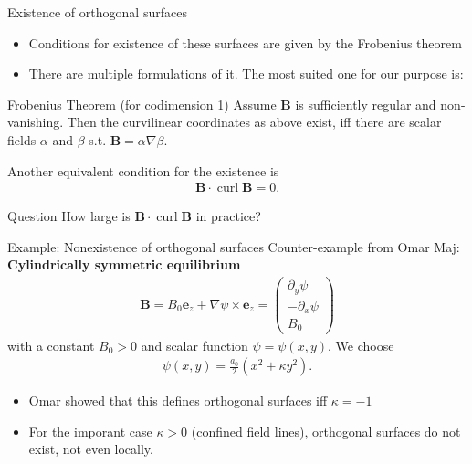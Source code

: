 \documentclass[
	english,%
	logo=false,%
	eurofusion=false, %
	titlegraphic=true, %
	]{ippbeamer}
\DeclareMathOperator{\curl}{curl}
\begin{document}
\begin{frame}{Existence of orthogonal surfaces}
	\begin{itemize}
		\item Conditions for existence of these surfaces are given by the 
			Frobenius theorem
		\item There are multiple formulations of it. The most suited one for our purpose is:
	\end{itemize}
	\begin{exampleblock}{Frobenius Theorem (for codimension 1)}
		Assume $\mathbf{B}$ is sufficiently regular and non-vanishing. Then the curvilinear coordinates as above 
		exist, iff there are scalar fields $\alpha$ and $\beta$ s.t. $\mathbf{B} = \alpha \nabla \beta$. 
	\end{exampleblock}

	Another equivalent condition for the existence is
	\begin{align*}
		\mathbf{B}\cdot \curl \mathbf{B} = 0.
	\end{align*}
	\vspace*{-0.75cm}
	\begin{exampleblock}{Question}
		How large is $\mathbf{B}\cdot \curl \mathbf{B}$ in practice?
	\end{exampleblock}

\end{frame}

\begin{frame}{Example: Nonexistence of orthogonal surfaces}
	Counter-example from Omar Maj: \textbf{Cylindrically symmetric equilibrium}
	\begin{align*}
		\mathbf{B} = B_0 \mathbf{e}_z + \nabla \psi \times \mathbf{e}_z
		= \begin{pmatrix}\partial_y \psi \\ -\partial_x  \psi \\ B_0 \end{pmatrix}
	\end{align*}
	with a constant $B_0 > 0$ and scalar function $\psi = \psi(x,y)$. 
	We choose 
	\begin{align*}
		\psi(x,y) = \frac{a_0}{2} (x^2 + \kappa y^2).
	\end{align*}
	\begin{itemize}
		\item Omar showed that this defines orthogonal surfaces iff 
			$\kappa = -1$
		\item For the imporant case $\kappa > 0$ (confined field
			lines), orthogonal surfaces do not exist, not even locally.
	\end{itemize}
\end{frame}
\end{document}
